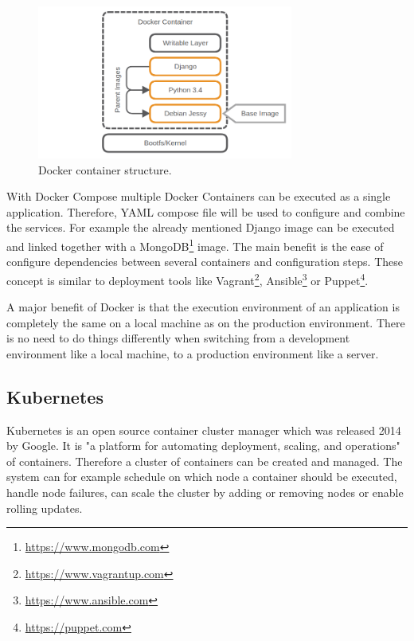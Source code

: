 \begin{figure}[H]
    \centering
    \includegraphics[width=0.75\textwidth]{resources/images/docker_container_structure.png}
    \caption[Docker container structure]{Docker container structure.}
    \label{fig:docker_container_structure}
\end{figure}

With Docker Compose multiple Docker Containers can be executed as a single application.
Therefore, YAML compose file will be used to configure and combine the services.
For example the already mentioned Django image can be executed and linked together with a MongoDB\footnote{\url{https://www.mongodb.com}} image.
The main benefit is the ease of configure dependencies between several containers and configuration steps.
These concept is similar to deployment tools like Vagrant\footnote{\url{https://www.vagrantup.com}}, Ansible\footnote{\url{https://www.ansible.com}} or Puppet\footnote{\url{https://puppet.com}}.

A major benefit of Docker is that the execution environment of an application is completely the same on a local machine as on the production environment.\autocite[cf.][p. 2]{Gallagher:2015}
There is no need to do things differently when switching from a development environment like a local machine, to a production environment like a server.\autocite[cf.][p. 2]{Gallagher:2015}

\subsection{Kubernetes}
\label{subsection:state-of-the-art:kubernetes}
Kubernetes is an open source container cluster manager which was released 2014 by Google.
It is "a platform for automating deployment, scaling, and operations"\autocite[p. 1]{Grant:2015} of containers.
Therefore a cluster of containers can be created and managed.
The system can for example schedule on which node a container should be executed, handle node failures, can scale the cluster by adding or removing nodes or enable rolling updates.\autocite[p. 5 f.]{Grant:2015}

